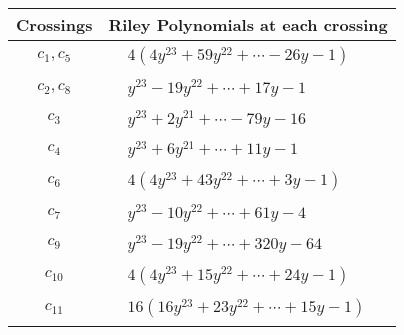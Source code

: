 \documentclass[1p]{elsarticle_modified}
\theoremstyle{definition}
\begin{document}
\begin{tabular}{m{50pt}|m{274pt}}
Crossings & \hspace{64pt}Riley Polynomials at each crossing \\
\hline $$\begin{aligned}c_{1},c_{5}\end{aligned}$$&$\begin{aligned}
&4(4 y^{23}+59 y^{22}+\cdots-26 y-1)
\end{aligned}$\\
\hline $$\begin{aligned}c_{2},c_{8}\end{aligned}$$&$\begin{aligned}
&y^{23}-19 y^{22}+\cdots+17 y-1
\end{aligned}$\\
\hline $$\begin{aligned}c_{3}\end{aligned}$$&$\begin{aligned}
&y^{23}+2 y^{21}+\cdots-79 y-16
\end{aligned}$\\
\hline $$\begin{aligned}c_{4}\end{aligned}$$&$\begin{aligned}
&y^{23}+6 y^{21}+\cdots+11 y-1
\end{aligned}$\\
\hline $$\begin{aligned}c_{6}\end{aligned}$$&$\begin{aligned}
&4(4 y^{23}+43 y^{22}+\cdots+3 y-1)
\end{aligned}$\\
\hline $$\begin{aligned}c_{7}\end{aligned}$$&$\begin{aligned}
&y^{23}-10 y^{22}+\cdots+61 y-4
\end{aligned}$\\
\hline $$\begin{aligned}c_{9}\end{aligned}$$&$\begin{aligned}
&y^{23}-19 y^{22}+\cdots+320 y-64
\end{aligned}$\\
\hline $$\begin{aligned}c_{10}\end{aligned}$$&$\begin{aligned}
&4(4 y^{23}+15 y^{22}+\cdots+24 y-1)
\end{aligned}$\\
\hline $$\begin{aligned}c_{11}\end{aligned}$$&$\begin{aligned}
&16(16 y^{23}+23 y^{22}+\cdots+15 y-1)
\end{aligned}$\\
\hline
\end{tabular}\\~\\
\end{document}
